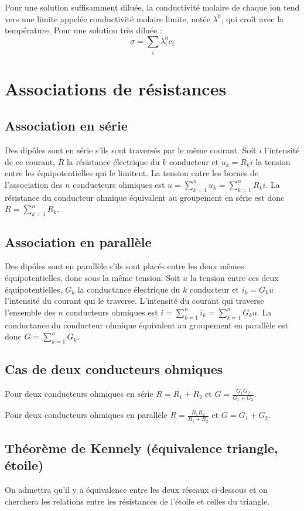 Pour une solution suffisamment diluée, la conductivité molaire de chaque ion tend vers une limite appelée conductivité molaire limite, notée $\lambda^0$, qui croît avec la température. Pour une solution très diluée : 
\begin{equation}
  \sigma = \sum_i \lambda_i^0 c_i
\end{equation}

\section{Associations de résistances}

\subsection{Association en série}

Des dipôles sont en série s'ils sont traversés par le même courant. Soit $i$ l'intensité de ce courant, $R$ la résistance électrique du $k$\ieme{} conducteur et $u_k = R_k i$ la tension entre les équipotentielles qui le limitent. La tension entre les bornes de l'association des $n$ conducteurs ohmiques est $u = \sum_{k=1}^n u_k = \sum_{k=1}^n R_k i$. La résistance du conducteur ohmique équivalent au groupement en série est donc $R = \sum_{k=1}^n R_k$.

\subsection{Association en parallèle}

Des dipôles sont en parallèle s'ils sont placés entre les deux mêmes équipotentielles, donc sous la même tension. Soit $u$ la tension entre ces deux équipotentielles, $G_k$ la conductance électrique du $k$\ieme{} conducteur et $i_k = G_k u$ l'intensité du courant qui le traverse. L'intensité du courant qui traverse l'ensemble des $n$ conducteurs ohmiques est $i = \sum_{k=1}^n i_k = \sum_{k=1}^n G_k u$. La conductance du conducteur ohmique équivalent au groupement en parallèle est donc $G = \sum_{k=1}^n G_k$.

\subsection{Cas de deux conducteurs ohmiques}

Pour deux conducteurs ohmiques en série $R=R_1+R_2$ et $G = \frac{G_1G_2}{G_1+G_2}$.

Pour deux conducteurs ohmiques en parallèle $R = \frac{R_1R_2}{R_1+R_2}$ et $G=G_1+G_2$.

\subsection{Théorème de Kennely (équivalence triangle, étoile)}

On admettra qu'il y a équivalence entre les deux réseaux ci-dessous et on cherchera les relations entre les résistances de l'étoile et celles du triangle.

